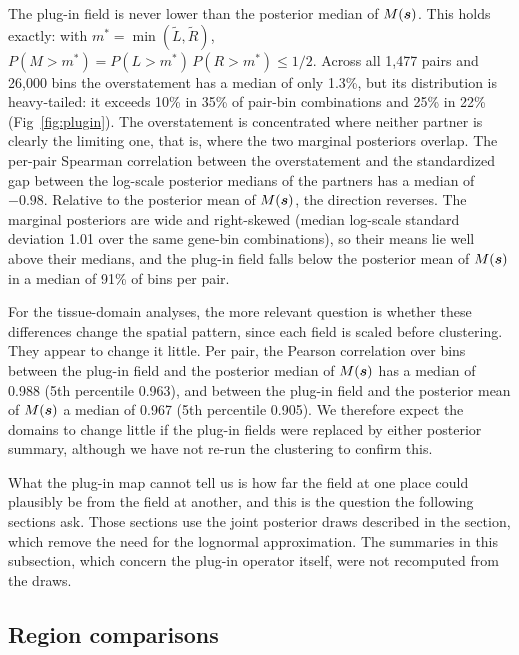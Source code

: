 \documentclass[10pt,letterpaper]{article}
\begin{document}
The plug-in field is never lower than the posterior median of $M(\mbox{\boldmath $s$})$. This holds exactly: with $m^* = \min(\tilde{L}, \tilde{R})$, $P(M > m^*) = P(L > m^*)\,P(R > m^*) \le 1/2$. Across all 1,477 pairs and 26,000 bins the overstatement has a median of only 1.3\%, but its distribution is heavy-tailed: it exceeds 10\% in 35\% of pair-bin combinations and 25\% in 22\% (Fig~\ref{fig:plugin}). The overstatement is concentrated where neither partner is clearly the limiting one, that is, where the two marginal posteriors overlap. The per-pair Spearman correlation between the overstatement and the standardized gap between the log-scale posterior medians of the partners has a median of $-0.98$. Relative to the posterior mean of $M(\mbox{\boldmath $s$})$, the direction reverses. The marginal posteriors are wide and right-skewed (median log-scale standard deviation 1.01 over the same gene-bin combinations), so their means lie well above their medians, and the plug-in field falls below the posterior mean of $M(\mbox{\boldmath $s$})$ in a median of 91\% of bins per pair.

For the tissue-domain analyses, the more relevant question is whether these differences change the spatial pattern, since each field is scaled before clustering. They appear to change it little. Per pair, the Pearson correlation over bins between the plug-in field and the posterior median of $M(\mbox{\boldmath $s$})$ has a median of 0.988 (5th percentile 0.963), and between the plug-in field and the posterior mean of $M(\mbox{\boldmath $s$})$ a median of 0.967 (5th percentile 0.905). We therefore expect the domains to change little if the plug-in fields were replaced by either posterior summary, although we have not re-run the clustering to confirm this.

What the plug-in map cannot tell us is how far the field at one place could plausibly be from the field at another, and this is the question the following sections ask. Those sections use the joint posterior draws described in the  section, which remove the need for the lognormal approximation. The summaries in this subsection, which concern the plug-in operator itself, were not recomputed from the draws.

\subsection*{Region comparisons}
\label{sec:res-regions}
\end{document}
